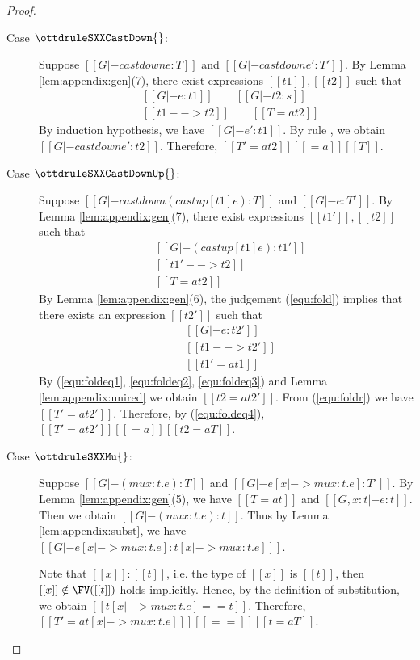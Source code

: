 \begin{proof}
\begin{description}
        \item[Case $\ottdruleSXXCastDown{}$:] $\quad$ \\
        Suppose $[[G |- castdown e :T]]$ and $[[G |- castdown e' :T']]$. By
Lemma \ref{lem:appendix:gen}(7), there exist expressions $[[t1]], [[t2]]$ such
that 
        \begin{align*}
            &[[G |- e:t1]] \qquad [[G |- t2:s]] \\
            &[[t1 --> t2]] \qquad [[T =a t2 ]]
        \end{align*}
        By induction hypothesis, we have $[[G |- e':t1]]$. By rule
, we obtain $[[G |- castdown e' : t2 ]]$. Therefore, $[[T'
=a t2]] [[=a]] [[T]]$.
        
        \item[Case $\ottdruleSXXCastDownUp{}$:] $\quad$ \\
        Suppose $[[G |- castdown (castup [t1] e) :T]]$ and $[[G |- e :T']]$. By
Lemma \ref{lem:appendix:gen}(7), there exist expressions $[[t1']], [[t2]]$ such
that 
        \begin{align}
            &[[G |- (castup [t1] e):t1']] \label{equ:fold} \\
            &[[t1' --> t2]] \label{equ:foldeq1} \\
            &[[T =a t2 ]] \label{equ:foldeq4}
        \end{align}
        By Lemma \ref{lem:appendix:gen}(6), the judgement (\ref{equ:fold})
implies that there exists an expression $[[t2']]$ such that
        \begin{align}
            &[[G |- e:t2']] \label{equ:foldr} \\
            &[[t1 --> t2']] \label{equ:foldeq2} \\
            &[[t1' =a t1]] \label{equ:foldeq3}
        \end{align}
        By (\ref{equ:foldeq1}, \ref{equ:foldeq2}, \ref{equ:foldeq3}) and Lemma
\ref{lem:appendix:unired} we obtain $[[t2 =a t2']]$. From (\ref{equ:foldr}) we
have $[[T' =a t2' ]]$. Therefore, by (\ref{equ:foldeq4}), $[[T' =a t2' ]]
[[=a]] [[t2 =a T]]$.
        
        \item[Case $\ottdruleSXXMu{}$:] $\quad$ \\
        Suppose $[[G |- (mu x:t.e) :T]]$ and $[[G |- e[x |-> mu x:t.e] :T']]$.
By Lemma \ref{lem:appendix:gen}(5), we have $[[T =a t]]$ and $[[G, x:t |-
e:t]]$. Then we obtain $[[G |- (mu x:t.e) : t]]$. Thus by Lemma
\ref{lem:appendix:subst}, we have $[[G |- e[x |-> mu x:t.e] : t[x |-> mu x:t.e]
]]$.
        
        Note that $[[x]]:[[t]]$, i.e. the type of $[[x]]$ is $[[t]]$, then
$[[x]] \notin \FV([[t]])$ holds implicitly. Hence, by the definition of
substitution, we obtain $[[t[x |-> mu x:t.e] == t]]$. Therefore, $[[T' =a t[x
|-> mu x:t.e] ]] [[==]] [[t =a T]]$.
    \end{description}
\end{proof}

